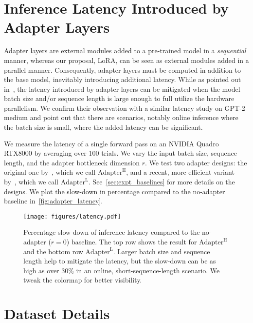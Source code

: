 \section{Inference Latency Introduced by Adapter Layers}
\label{app:adapter_latency}
Adapter layers are external modules added to a pre-trained model in a \textit{sequential} manner, whereas our proposal, LoRA, can be seen as external modules added in a parallel manner.
Consequently, adapter layers must be computed in addition to the base model, inevitably introducing additional latency.
While as pointed out in~\cite{ruckle2020adapterdrop}, the latency introduced by adapter layers can be mitigated when the model batch size and/or sequence length is large enough to full utilize the hardware parallelism.
We confirm their observation with a similar latency study on GPT-2 medium and point out that there are scenarios, notably online inference where the batch size is small, where the added latency can be significant.

We measure the latency of a single forward pass on an NVIDIA Quadro RTX8000 by averaging over 100 trials.
We vary the input batch size, sequence length, and the adapter bottleneck dimension $r$.
We test two adapter designs: the original one by~\cite{houlsby_parameter-efficient_2019}, which we call $\text{Adapter}^{\text{H}}$, and a recent, more efficient variant by~\cite{lin-etal-2020-exploring}, which we call $\text{Adapter}^{\text{L}}$.
See~\autoref{sec:expt_baselines} for more details on the designs.
We plot the slow-down in percentage compared to the no-adapter baseline in~\autoref{fig:adapter_latency}.

\begin{figure}[h]
  \centering
    \texttt{[image: figures/latency.pdf]}
    \caption{Percentage slow-down of inference latency compared to the no-adapter ($r=0$) baseline. The top row shows the result for $\text{Adapter}^{\text{H}}$ and the bottom row $\text{Adapter}^{\text{L}}$. Larger batch size and sequence length help to mitigate the latency, but the slow-down can be as high as over 30\% in an online, short-sequence-length scenario. We tweak the colormap for better visibility.}
    \label{fig:adapter_latency}
\end{figure}

\section{Dataset Details}
\label{app:datasets}




